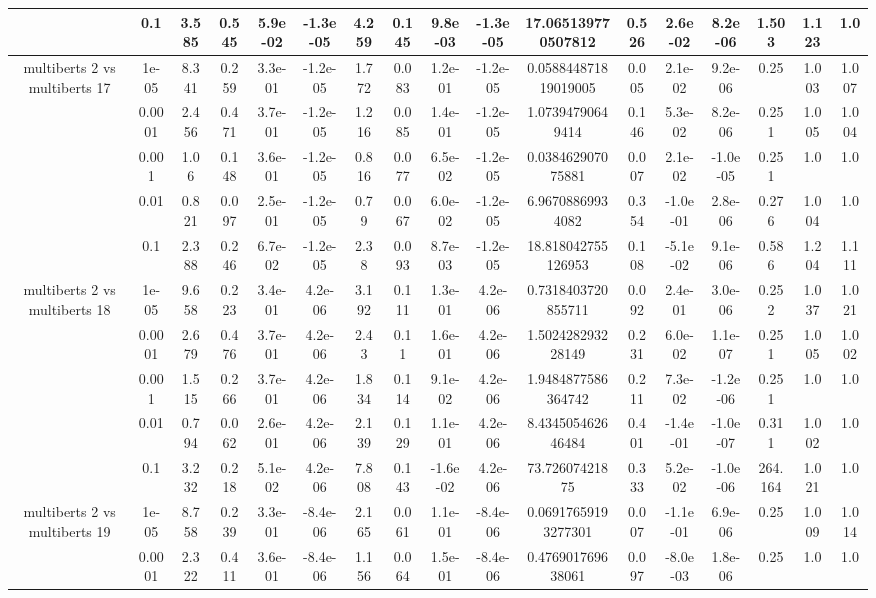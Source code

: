 \begin{tabular}{|c|c|c|c|c|c|c|c|c|c|c|c|c|c|c|c|c|}
 & 0.1 & 3.585 & 0.545 & 5.9e-02 & -1.3e-05 & 4.259 & 0.145 & 9.8e-03 & -1.3e-05 & 17.065139770507812 & 0.526 & 2.6e-02 & 8.2e-06 & 1.503 & 1.123 & 1.0 \\
\hline
\multirow{5}{*}{multiberts 2 vs multiberts 17} & 1e-05 & 8.341 & 0.259 & 3.3e-01 & -1.2e-05 & 1.772 & 0.083 & 1.2e-01 & -1.2e-05 & 0.058844871819019005 & 0.005 & 2.1e-02 & 9.2e-06 & 0.25 & 1.003 & 1.007 \\
 & 0.0001 & 2.456 & 0.471 & 3.7e-01 & -1.2e-05 & 1.216 & 0.085 & 1.4e-01 & -1.2e-05 & 1.07394790649414 & 0.146 & 5.3e-02 & 8.2e-06 & 0.251 & 1.005 & 1.004 \\
 & 0.001 & 1.06 & 0.148 & 3.6e-01 & -1.2e-05 & 0.816 & 0.077 & 6.5e-02 & -1.2e-05 & 0.038462907075881 & 0.007 & 2.1e-02 & -1.0e-05 & 0.251 & 1.0 & 1.0 \\
 & 0.01 & 0.821 & 0.097 & 2.5e-01 & -1.2e-05 & 0.79 & 0.067 & 6.0e-02 & -1.2e-05 & 6.96708869934082 & 0.354 & -1.0e-01 & 2.8e-06 & 0.276 & 1.004 & 1.0 \\
 & 0.1 & 2.388 & 0.246 & 6.7e-02 & -1.2e-05 & 2.38 & 0.093 & 8.7e-03 & -1.2e-05 & 18.818042755126953 & 0.108 & -5.1e-02 & 9.1e-06 & 0.586 & 1.204 & 1.111 \\
\hline
\multirow{5}{*}{multiberts 2 vs multiberts 18} & 1e-05 & 9.658 & 0.223 & 3.4e-01 & 4.2e-06 & 3.192 & 0.111 & 1.3e-01 & 4.2e-06 & 0.7318403720855711 & 0.092 & 2.4e-01 & 3.0e-06 & 0.252 & 1.037 & 1.021 \\
 & 0.0001 & 2.679 & 0.476 & 3.7e-01 & 4.2e-06 & 2.43 & 0.11 & 1.6e-01 & 4.2e-06 & 1.502428293228149 & 0.231 & 6.0e-02 & 1.1e-07 & 0.251 & 1.005 & 1.002 \\
 & 0.001 & 1.515 & 0.266 & 3.7e-01 & 4.2e-06 & 1.834 & 0.114 & 9.1e-02 & 4.2e-06 & 1.9484877586364742 & 0.211 & 7.3e-02 & -1.2e-06 & 0.251 & 1.0 & 1.0 \\
 & 0.01 & 0.794 & 0.062 & 2.6e-01 & 4.2e-06 & 2.139 & 0.129 & 1.1e-01 & 4.2e-06 & 8.434505462646484 & 0.401 & -1.4e-01 & -1.0e-07 & 0.311 & 1.002 & 1.0 \\
 & 0.1 & 3.232 & 0.218 & 5.1e-02 & 4.2e-06 & 7.808 & 0.143 & -1.6e-02 & 4.2e-06 & 73.72607421875 & 0.333 & 5.2e-02 & -1.0e-06 & 264.164 & 1.021 & 1.0 \\
\hline
\multirow{5}{*}{multiberts 2 vs multiberts 19} & 1e-05 & 8.758 & 0.239 & 3.3e-01 & -8.4e-06 & 2.165 & 0.061 & 1.1e-01 & -8.4e-06 & 0.06917659193277301 & 0.007 & -1.1e-01 & 6.9e-06 & 0.25 & 1.009 & 1.014 \\
 & 0.0001 & 2.322 & 0.411 & 3.6e-01 & -8.4e-06 & 1.156 & 0.064 & 1.5e-01 & -8.4e-06 & 0.476901769638061 & 0.097 & -8.0e-03 & 1.8e-06 & 0.25 & 1.0 & 1.0 \\

\end{tabular}
